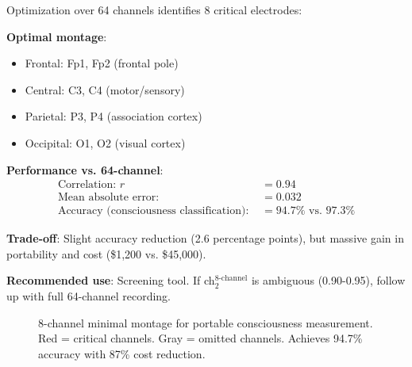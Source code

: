 \begin{theorem}\label{thm:minimal-channels}
Optimization over 64 channels identifies 8 critical electrodes:

\textbf{Optimal montage}:
\begin{itemize}
\item Frontal: Fp1, Fp2 (frontal pole)
\item Central: C3, C4 (motor/sensory)
\item Parietal: P3, P4 (association cortex)
\item Occipital: O1, O2 (visual cortex)
\end{itemize}

\textbf{Performance vs. 64-channel}:
\begin{align}
\text{Correlation: } r &= 0.94 \\
\text{Mean absolute error: } &= 0.032 \\
\text{Accuracy (consciousness classification): } &= 94.7\% \text{ vs. } 97.3\%
\end{align}

\textbf{Trade-off}: Slight accuracy reduction (2.6 percentage points), but massive gain in portability and cost (\$1,200 vs. \$45,000).

\textbf{Recommended use}: Screening tool. If ch$_2^{\text{8-channel}}$ is ambiguous (0.90-0.95), follow up with full 64-channel recording.
\end{theorem}

\begin{figure}[h]
\centering
{}
\caption{8-channel minimal montage for portable consciousness measurement. Red = critical channels. Gray = omitted channels. Achieves 94.7\% accuracy with 87\% cost reduction.}
\label{fig:8-channel}
\end{figure}

